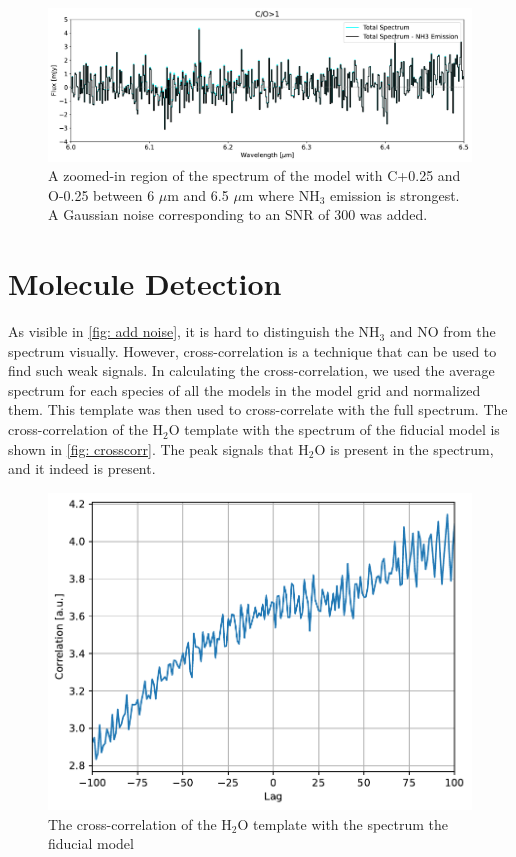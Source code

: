 \documentclass[twoside, single, authoryear, semicolon, 12pt]{lion-msc}
\newcommand{\4}{$_4$}
\newcommand{\3}{$_3$}
\newcommand{\2}{$_2$}
\begin{document}
\begin{figure}[!ht]
    \centering
    \includegraphics[width=\linewidth]{Figures/AddNoise.pdf}
    \caption{A zoomed-in region of the spectrum of the model with C+0.25 and O-0.25 between 6 $\mu$m and 6.5 $\mu$m where NH\3 emission is strongest. A Gaussian noise corresponding to an SNR of 300 was added.}
    \label{fig: add noise}
\end{figure}

\section{Molecule Detection}
As visible in \autoref{fig: add noise}, it is hard to distinguish the NH\3 and NO from the spectrum visually. However, cross-correlation is a technique that can be used to find such weak signals. In calculating the cross-correlation, we used the average spectrum for each species of all the models in the model grid and normalized them. This template was then used to cross-correlate with the full spectrum. The cross-correlation of the H\2O template with the spectrum of the fiducial model is shown in \autoref{fig: crosscorr}. The peak signals that H\2O is present in the spectrum, and it indeed is present. 

\begin{figure}[!ht]
    \centering
    \includegraphics[width=.6\linewidth]{Figures/Cross-Correlation.pdf}
    \caption{The cross-correlation of the H\2O template with the spectrum the fiducial model}
    \label{fig: crosscorr}
\end{figure}
\end{document}
